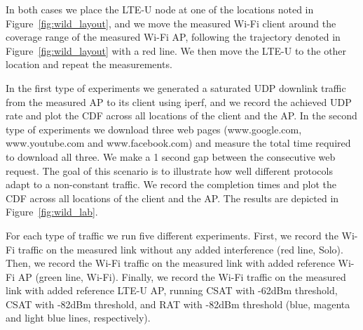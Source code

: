 In both cases we place the LTE-U node at one of the locations noted in Figure~\ref{fig:wild_layout}, and we move the measured Wi-Fi client around the coverage range of the measured Wi-Fi AP, following the trajectory denoted in Figure~\ref{fig:wild_layout} with a red line. We then move the LTE-U to the other location and repeat the measurements. 

In the first type of experiments we generated a saturated UDP downlink traffic from the measured AP to its client using iperf, and we record the achieved UDP rate and plot the CDF across all locations of the client and the AP. 
In the second type of experiments we download three web pages (www.google.com, www.youtube.com and www.facebook.com) and measure the total time required to download all three. 
We make a 1 second gap between the consecutive web request. 
The goal of this scenario is to illustrate how well different protocols adapt to a non-constant traffic. 
We record the completion times and plot the CDF across all locations of the client and the AP. 
The results are depicted in Figure~\ref{fig:wild_lab}. 

For each type of traffic we run five different experiments. 
First, we record the Wi-Fi traffic on the measured link without any added interference (red line, Solo).
Then, we record the Wi-Fi traffic on the measured link with added reference Wi-Fi AP (green line, Wi-Fi).
Finally, we record the Wi-Fi traffic on the measured link with added reference LTE-U AP, running CSAT with -62dBm threshold, 
CSAT with -82dBm threshold, and RAT with -82dBm threshold (blue, magenta and light blue lines, respectively).


